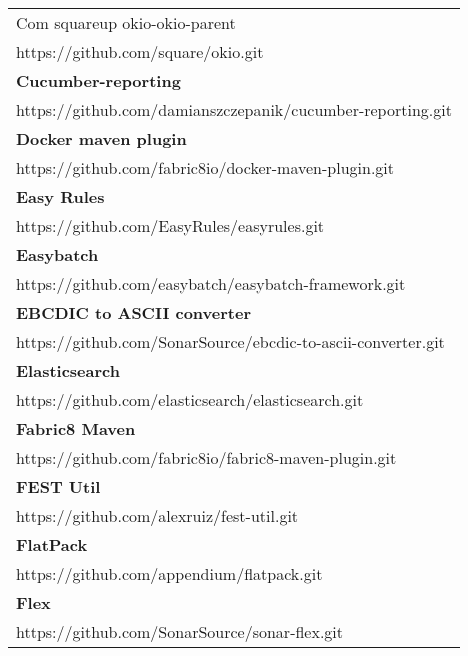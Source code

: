 \begin{table}[]
\begin{tabular}{|p{130mm}|}
Com squareup okio-okio-parent                      \\ https://github.com/square/okio.git                                           \\ \hline \bf
Cucumber-reporting                                 \\ https://github.com/damianszczepanik/cucumber-reporting.git                   \\ \hline \bf
Docker maven plugin                                \\ https://github.com/fabric8io/docker-maven-plugin.git                         \\ \hline \bf
Easy Rules                                         \\ https://github.com/EasyRules/easyrules.git                                   \\ \hline \bf
Easybatch                                          \\ https://github.com/easybatch/easybatch-framework.git                         \\ \hline \bf
EBCDIC to ASCII converter                          \\ https://github.com/SonarSource/ebcdic-to-ascii-converter.git                 \\ \hline \bf
Elasticsearch                                      \\ https://github.com/elasticsearch/elasticsearch.git                           \\ \hline \bf
Fabric8 Maven                           \\ https://github.com/fabric8io/fabric8-maven-plugin.git                        \\ \hline \bf
FEST Util                                          \\ https://github.com/alexruiz/fest-util.git                                    \\ \hline \bf
FlatPack                                           \\ https://github.com/appendium/flatpack.git                                    \\ \hline \bf
Flex                                               \\ https://github.com/SonarSource/sonar-flex.git                                \\ \hline
\end{tabular}
\end{table}

